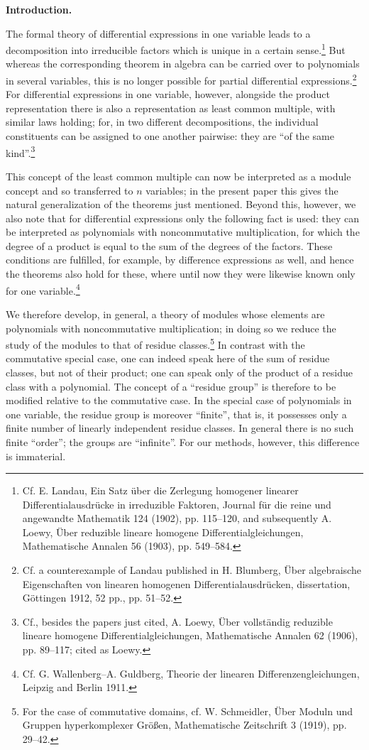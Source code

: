 \documentclass[11pt]{article}
\begin{document}
\begin{center}\textbf{Introduction.}\end{center}

The formal theory of differential expressions in one variable leads to a decomposition into irreducible factors which is unique in a certain sense.\footnote{Cf. E. Landau, Ein Satz über die Zerlegung homogener linearer Differentialausdrücke in irreduzible Faktoren, Journal für die reine und angewandte Mathematik 124 (1902), pp. 115--120, and subsequently A. Loewy, Über reduzible lineare homogene Differentialgleichungen, Mathematische Annalen 56 (1903), pp. 549--584.} But whereas the corresponding theorem in algebra can be carried over to polynomials in several variables, this is no longer possible for partial differential expressions.\footnote{Cf. a counterexample of Landau published in H. Blumberg, Über algebraische Eigenschaften von linearen homogenen Differentialausdrücken, dissertation, Göttingen 1912, 52 pp., pp. 51--52.} For differential expressions in one variable, however, alongside the product representation there is also a representation as least common multiple, with similar laws holding; for, in two different decompositions, the individual constituents can be assigned to one another pairwise: they are ``of the same kind''.\footnote{Cf., besides the papers just cited, A. Loewy, Über vollständig reduzible lineare homogene Differentialgleichungen, Mathematische Annalen 62 (1906), pp. 89--117; cited as Loewy.}

This concept of the least common multiple can now be interpreted as a module concept and so transferred to $n$ variables; in the present paper this gives the natural generalization of the theorems just mentioned. Beyond this, however, we also note that for differential expressions only the following fact is used: they can be interpreted as polynomials with noncommutative multiplication, for which the degree of a product is equal to the sum of the degrees of the factors. These conditions are fulfilled, for example, by difference expressions as well, and hence the theorems also hold for these, where until now they were likewise known only for one variable.\footnote{Cf. G. Wallenberg--A. Guldberg, Theorie der linearen Differenzengleichungen, Leipzig and Berlin 1911.}

We therefore develop, in general, a theory of modules whose elements are polynomials with noncommutative multiplication; in doing so we reduce the study of the modules to that of residue classes.\footnote{For the case of commutative domains, cf. W. Schmeidler, Über Moduln und Gruppen hyperkomplexer Größen, Mathematische Zeitschrift 3 (1919), pp. 29--42.} In contrast with the commutative special case, one can indeed speak here of the sum of residue classes, but not of their product; one can speak only of the product of a residue class with a polynomial. The concept of a ``residue group'' is therefore to be modified relative to the commutative case. In the special case of polynomials in one variable, the residue group is moreover ``finite'', that is, it possesses only a finite number of linearly independent residue classes. In general there is no such finite ``order''; the groups are ``infinite''. For our methods, however, this difference is immaterial.
\end{document}
